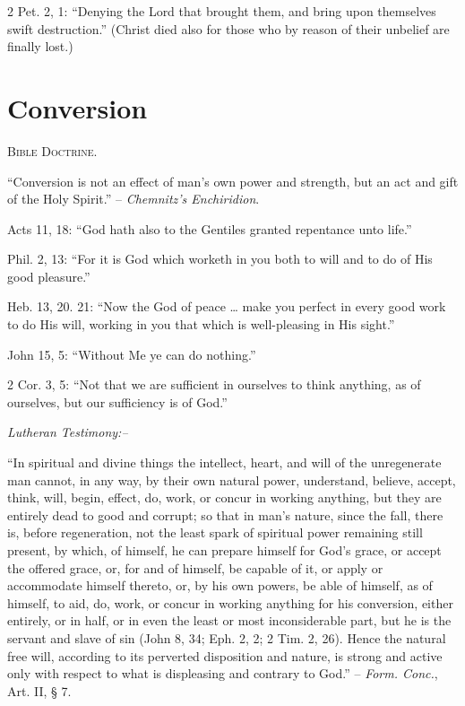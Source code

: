 \documentclass[
]{book}
\begin{document}
2 Pet. 2, 1: ``Denying the Lord that brought them, and bring upon themselves swift destruction.'' (Christ died also for those who by reason of their unbelief are finally lost.)

\section{Conversion}\label{conversion}

\begin{center}
\textsc{Bible Doctrine.}
\end{center}

``Conversion is not an effect of man's own power and strength, but an act and gift of the Holy Spirit.'' -- \emph{Chemnitz's Enchiridion}.

Acts 11, 18: ``God hath also to the Gentiles granted repentance unto life.''

Phil. 2, 13: ``For it is God which worketh in you both to will and to do of His good pleasure.''

Heb. 13, 20. 21: ``Now the God of peace \ldots{} make you perfect in every good work to do His will, working in you that which is well-pleasing in His sight.''

John 15, 5: ``Without Me ye can do nothing.''

2 Cor. 3, 5: ``Not that we are sufficient in ourselves to think anything, as of ourselves, but our sufficiency is of God.''

\begin{center}
\textsl{Lutheran Testimony:--}
\end{center}

``In spiritual and divine things the intellect, heart, and will of the unregenerate man cannot, in any way, by their own natural power, understand, believe, accept, think, will, begin, effect, do, work, or concur in working anything, but they are entirely dead to good and corrupt; so that in man's nature, since the fall, there is, before regeneration, not the least spark of spiritual power remaining still present, by which, of himself, he can prepare himself for God's grace, or accept the offered grace, or, for and of himself, be capable of it, or apply or accommodate himself thereto, or, by his own powers, be able of himself, as of himself, to aid, do, work, or concur in working anything for his conversion, either entirely, or in half, or in even the least or most inconsiderable part, but he is the servant and slave of sin (John 8, 34; Eph. 2, 2; 2 Tim. 2, 26). Hence the natural free will, according to its perverted disposition and nature, is strong and active only with respect to what is displeasing and contrary to God.'' -- \emph{Form. Conc.}, Art. II, § 7.
\end{document}
